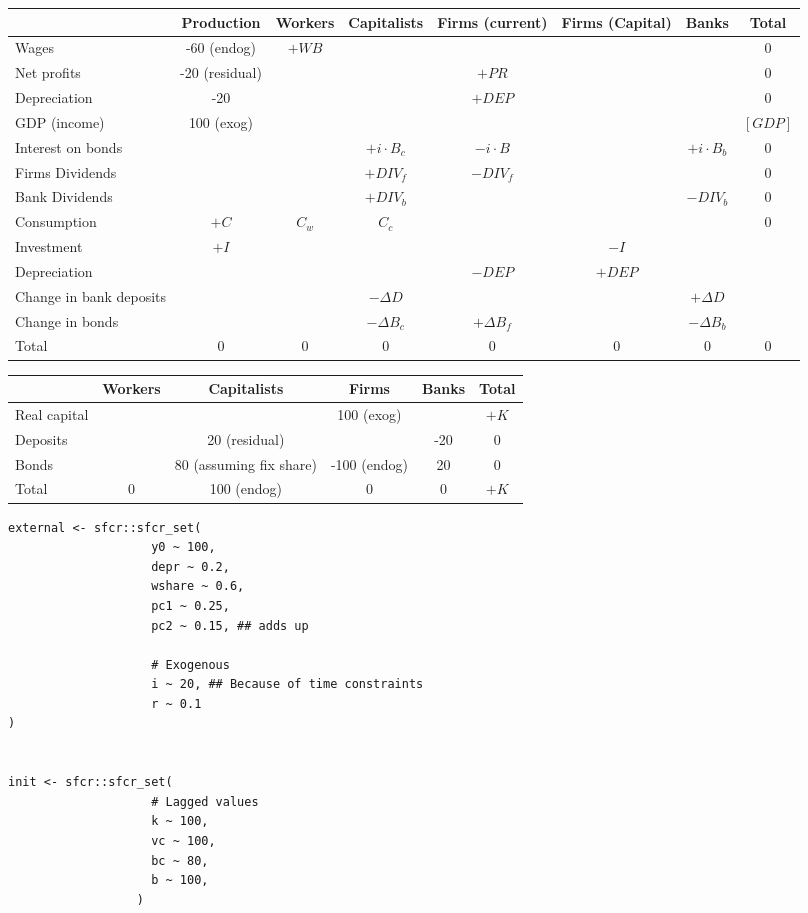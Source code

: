 \documentclass[11pt]{article}
\begin{document}
\begin{center}
\begin{tabular}{lccccccc}
\hline
 & Production & Workers & Capitalists & Firms (current) & Firms (Capital) & Banks & Total\\
\hline
Wages & -60 (endog) & \(+WB\) &  &  &  &  & 0\\
Net profits & -20 (residual) &  &  & \(+PR\) &  &  & 0\\
Depreciation & -20 &  &  & \(+DEP\) &  &  & 0\\
\hline
GDP (income) & 100 (exog) &  &  &  &  &  & \([GDP]\)\\
\hline
Interest on bonds &  &  & \(+i\cdot B_{c}\) & \(-i\cdot B\) &  & \(+i\cdot B_{b}\) & 0\\
Firms Dividends &  &  & \(+DIV_{f}\) & \(-DIV_{f}\) &  &  & 0\\
Bank Dividends &  &  & \(+DIV_{b}\) &  &  & \(-DIV_{b}\) & 0\\
\hline
Consumption & \(+C\) & \(C_{w}\) & \(C_{c}\) &  &  &  & 0\\
Investment & \(+I\) &  &  &  & \(-I\) &  & \\
Depreciation &  &  &  & \(-DEP\) & \(+DEP\) &  & \\
\hline
Change in bank deposits &  &  & \(-\Delta D\) &  &  & \(+\Delta D\) & \\
Change in bonds &  &  & \(-\Delta B_{c}\) & \(+\Delta B_{f}\) &  & \(-\Delta B_{b}\) & \\
\hline
Total & 0 & 0 & 0 & 0 & 0 & 0 & 0\\
\hline
\end{tabular}

\end{center}


\begin{center}
\begin{tabular}{lccccc}
\hline
 & Workers & Capitalists & Firms & Banks & Total\\
\hline
Real capital &  &  & 100 (exog) &  & \(+K\)\\
Deposits &  & 20 (residual) &  & -20 & 0\\
Bonds &  & 80 (assuming fix share) & -100 (endog) & 20 & 0\\
\hline
Total & 0 & 100 (endog) & 0 & 0 & \(+K\)\\
\hline
\end{tabular}

\end{center}

\begin{verbatim}
external <- sfcr::sfcr_set(
                    y0 ~ 100,
                    depr ~ 0.2,
                    wshare ~ 0.6,
                    pc1 ~ 0.25,
                    pc2 ~ 0.15, ## adds up

                    # Exogenous
                    i ~ 20, ## Because of time constraints
                    r ~ 0.1
)


init <- sfcr::sfcr_set(
                    # Lagged values
                    k ~ 100,
                    vc ~ 100,
                    bc ~ 80,
                    b ~ 100,
                  )
\end{verbatim}
\end{document}
